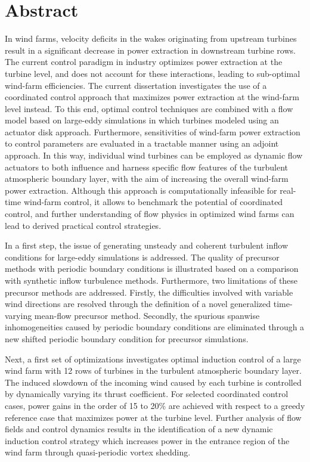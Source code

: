 \chapter{Abstract}                                 \label{ch:abstract}

In wind farms, velocity deficits in the wakes originating from upstream turbines result in a significant decrease in power extraction in downstream turbine rows. The current control paradigm in industry optimizes power extraction at the turbine level, and does not account for these interactions, leading to sub-optimal wind-farm efficiencies. The current dissertation investigates the use of a coordinated control approach that maximizes power extraction at the wind-farm level instead. To this end, optimal control techniques are combined with a flow model based on large-eddy simulations in which turbines modeled using an actuator disk approach. Furthermore, sensitivities of wind-farm power extraction to control parameters are evaluated in a tractable manner using an adjoint approach. In this way, individual wind turbines can be employed as dynamic flow actuators to both influence and harness specific flow features of the turbulent atmospheric boundary layer, with the aim of increasing the overall wind-farm power extraction. Although this approach is computationally infeasible for real-time wind-farm control, it allows to benchmark the potential of coordinated control, and further understanding of flow physics in optimized wind farms can lead to derived practical control strategies.

In a first step, the issue of generating unsteady and coherent turbulent inflow conditions for large-eddy simulations is addressed. The quality of precursor methods with periodic boundary conditions is illustrated based on a comparison with synthetic inflow turbulence methods. Furthermore, two limitations of these precursor methods are addressed. Firstly, the difficulties involved with variable wind directions are resolved through the definition of a novel generalized time-varying mean-flow precursor method. Secondly, the spurious spanwise inhomogeneities caused by periodic boundary conditions are eliminated through a new shifted periodic boundary condition for precursor simulations. 

\clearpage
Next, a first set of optimizations investigates optimal induction control of a large wind farm with 12 rows of turbines in the turbulent atmospheric boundary layer. The induced slowdown of the incoming wind caused by each turbine is controlled by dynamically varying its thrust coefficient. For selected coordinated control cases, power gains in the order of 15 to 20\% are achieved with respect to a greedy reference case that maximizes power at the turbine level. Further analysis of flow fields and control dynamics results in the identification of a new dynamic induction control strategy which increases power in the entrance region of the wind farm through quasi-periodic vortex shedding. 

